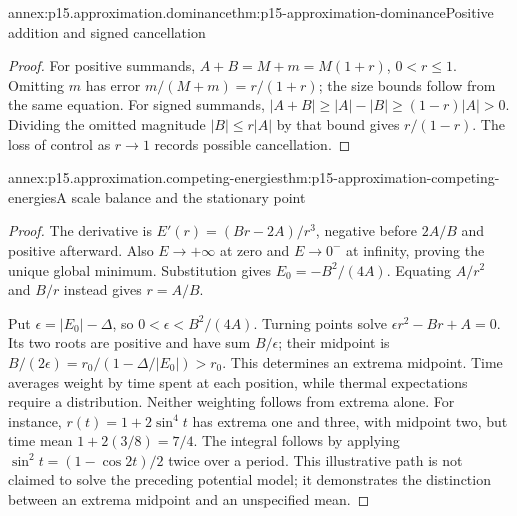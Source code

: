 \begin{annexitem}{annex:p15.approximation.dominance}{thm:p15-approximation-dominance}{Positive addition and signed cancellation}
\begin{proof}
For positive summands, \(A+B=M+m=M(1+r)\), \(0<r\leq1\).
Omitting \(m\) has error \(m/(M+m)=r/(1+r)\); the size bounds follow
from the same equation. For signed summands,
\(|A+B|\geq|A|-|B|\geq(1-r)|A|>0\). Dividing the omitted magnitude
\(|B|\leq r|A|\) by that bound gives \(r/(1-r)\). The loss of control
as \(r\to1\) records possible cancellation.
\end{proof}
\end{annexitem}

\begin{annexitem}{annex:p15.approximation.competing-energies}{thm:p15-approximation-competing-energies}{A scale balance and the stationary point}
\begin{proof}
The derivative is \(E'(r)=(Br-2A)/r^3\), negative before \(2A/B\)
and positive afterward. Also \(E\to+\infty\) at zero and
\(E\to0^-\) at infinity, proving the unique global minimum.
Substitution gives \(E_0=-B^2/(4A)\). Equating \(A/r^2\) and \(B/r\)
instead gives \(r=A/B\).

Put \(\epsilon=|E_0|-\Delta\), so
\(0<\epsilon<B^2/(4A)\). Turning points solve
\(\epsilon r^2-Br+A=0\). Its two roots are positive and have sum
\(B/\epsilon\); their midpoint is
\(B/(2\epsilon)=r_0/(1-\Delta/|E_0|)>r_0\).
This determines an extrema midpoint. Time averages weight by time spent
at each position, while thermal expectations require a distribution.
Neither weighting follows from extrema alone. For instance,
\(r(t)=1+2\sin^4t\) has extrema one and three, with midpoint two,
but time mean \(1+2(3/8)=7/4\). The integral follows by applying
\(\sin^2t=(1-\cos2t)/2\) twice over a period. This illustrative path
is not claimed to solve the preceding potential model; it demonstrates
the distinction between an extrema midpoint and an unspecified mean.
\end{proof}
\end{annexitem}

